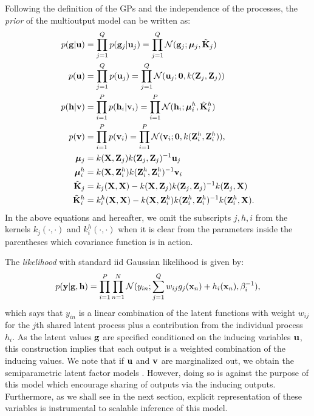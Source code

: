 Following the definition of the GPs and the independence of the processes, the \emph{prior} of the multioutput model can be written as:
\begin{align}
\label{eq:gu}
p(\mathbf{g} | \mathbf{u}) &= \prod_{j=1}^Q p(\mathbf{g}_j | \mathbf{u}_j) = \prod_{j=1}^Q \mathcal{N}(\mathbf{g}_j; \boldsymbol{\mu}_j, \tilde{\mathbf{K}}_j )\\
p(\mathbf{u}) &= \prod_{j=1}^Q p(\mathbf{u}_j) = \prod_{j=1}^Q \mathcal{N}(\mathbf{u}_j; \mathbf{0}, k(\mathbf{Z}_j, \mathbf{Z}_j)) \\
\label{eq:hv}
p(\mathbf{h} | \mathbf{v}) &= \prod_{i=1}^P p(\mathbf{h}_i | \mathbf{v}_i) = \prod_{i=1}^P \mathcal{N}(\mathbf{h}_i; \boldsymbol{\mu}^h_i, \tilde{\mathbf{K}}^h_i)\\
p(\mathbf{v}) &= \prod_{i=1}^P p(\mathbf{v}_i) = \prod_{i=1}^P \mathcal{N}(\mathbf{v}_i; \mathbf{0}, k(\mathbf{Z}^h_i, \mathbf{Z}^h_i)), \\
 \boldsymbol{\mu}_j &= k(\mathbf{X},\mathbf{Z}_j)k(\mathbf{Z}_j,\mathbf{Z}_j)^{-1}\mathbf{u}_j \\
\boldsymbol{\mu}^h_i &= k(\mathbf{X},\mathbf{Z}^h_i)k(\mathbf{Z}^h_i,\mathbf{Z}^h_i)^{-1}\mathbf{v}_i \\
\tilde{\mathbf{K}}_j &= k_j(\mathbf{X},\mathbf{X}) - k(\mathbf{X},\mathbf{Z}_j)k(\mathbf{Z}_j,\mathbf{Z}_j)^{-1}k(\mathbf{Z}_j,\mathbf{X}) \\
\tilde{\mathbf{K}}^h_i &= k^h_i(\mathbf{X},\mathbf{X}) - k(\mathbf{X},\mathbf{Z}^h_i)k(\mathbf{Z}^h_i,\mathbf{Z}^h_i)^{-1}k(\mathbf{Z}^h_i,\mathbf{X}).
\end{align}
In the above equations and hereafter, we omit the subscripts $j,h,i$ from the kernels $k_j(\cdot,\cdot)$ and $k^h_i(\cdot,\cdot)$ when it is clear from the parameters inside the parentheses which covariance function is in action. 

The \emph{likelihood} with standard iid Gaussian likelihood is given by:
\begin{align}
p(\mathbf{y} | \mathbf{g}, \mathbf{h} ) = \prod_{i=1}^P \prod_{n=1}^N \mathcal{N}( y_{in} ; \sum_{j=1}^Q w_{ij} g_j(\mathbf{x}_n) + h_i(\mathbf{x}_n), \beta_i^{-1}),
\end{align}
which says that $y_{in}$ is a linear combination of the latent functions with weight $w_{ij}$ for the $j$th shared latent process plus a contribution from the individual process $h_i$.
As the latent values $\mathbf{g}$ are specified conditioned on the inducing variables $\mathbf{u}$, this construction implies that each output is a weighted combination of the inducing values.
We note that if $\mathbf{u}$ and $\mathbf{v}$ are marginalized out, we obtain the semiparametric latent factor models \citep{teh-et-al-aistats-05,seeger2005semiparametric}.
However, doing so is against the purpose of this model which encourage sharing of outputs via the inducing outputs.
Furthermore, as we shall see in the next section, explicit representation of these variables is instrumental to scalable inference of this model.

